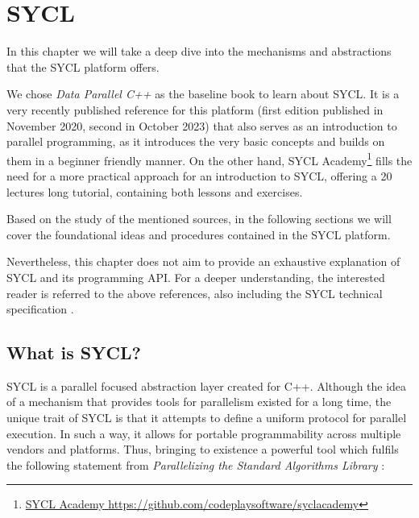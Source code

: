 %
%
%
%


\chapter{SYCL} \label{chap:SYCL}

In this chapter we will take a deep dive into the mechanisms and abstractions that the SYCL platform offers.

We chose \textit{Data Parallel C++} \cite{Reinders:2023:Data} as the baseline book to learn about SYCL.
It is a very recently published reference for this platform (first edition published in November 2020, second in October 2023) that also serves as an introduction to parallel programming, as it introduces the very basic concepts and builds on them in a beginner friendly manner.
On the other hand, SYCL Academy\footnote{\href{https://github.com/codeplaysoftware/syclacademy}{{SYCL Academy} \url{https://github.com/codeplaysoftware/syclacademy}}} fills the need for a more practical approach for an introduction to SYCL, offering a 20 lectures long tutorial, containing both lessons and exercises.

Based on the study of the mentioned sources, in the following sections we will cover the foundational ideas and procedures contained in the SYCL platform.

Nevertheless, this chapter does not aim to provide an exhaustive explanation of SYCL and its programming API.
For a deeper understanding, the interested reader is referred to the above references, also including the SYCL technical specification \cite{URL::SYCL-Specification}.

\section{What is SYCL?}

SYCL is a parallel focused abstraction layer created for C++. Although the idea of a mechanism that provides tools for parallelism existed for a long time, the unique trait of SYCL is that it attempts to define a uniform protocol for parallel execution.
In such a way, it allows for portable programmability across multiple vendors and platforms. Thus, bringing to existence a powerful tool which fulfils the following statement from \textit{Parallelizing the Standard Algorithms Library} \cite{Hoberock:2012:Parallelizing}:

